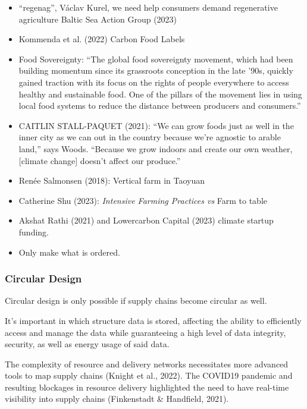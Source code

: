 \documentclass[
  letterpaper,
  DIV=11,
  numbers=noendperiod]{scrartcl}
\begin{document}
\begin{itemize}
\item
  ``regenag'', Václav Kurel, we need help consumers demand regenerative
  agriculture Baltic Sea Action Group (2023)
\item
  Kommenda et al. (2022) Carbon Food Labels
\item
  Food Sovereignty: ``The global food sovereignty movement, which had
  been building momentum since its grassroots conception in the late
  '90s, quickly gained traction with its focus on the rights of people
  everywhere to access healthy and sustainable food. One of the pillars
  of the movement lies in using local food systems to reduce the
  distance between producers and consumers.''
\item
  CAITLIN STALL-PAQUET (2021): ``We can grow foods just as well in the
  inner city as we can out in the country because we're agnostic to
  arable land,'' says Woods. ``Because we grow indoors and create our
  own weather, {[}climate change{]} doesn't affect our produce.''
\item
  Renée Salmonsen (2018): Vertical farm in Taoyuan
\item
  Catherine Shu (2023): \emph{Intensive Farming Practices vs} Farm to
  table
\item
  Akshat Rathi (2021) and Lowercarbon Capital (2023) climate startup
  funding.
\item
  Only make what is ordered.
\end{itemize}

\subsubsection{Circular Design}\label{circular-design}

Circular design is only possible if supply chains become circular as
well.

It's important in which structure data is stored, affecting the ability
to efficiently access and manage the data while guaranteeing a high
level of data integrity, security, as well as energy usage of said data.

The complexity of resource and delivery networks necessitates more
advanced tools to map supply chains (Knight et al., 2022). The COVID19
pandemic and resulting blockages in resource delivery highlighted the
need to have real-time visibility into supply chains (Finkenstadt \&
Handfield, 2021).
\end{document}
